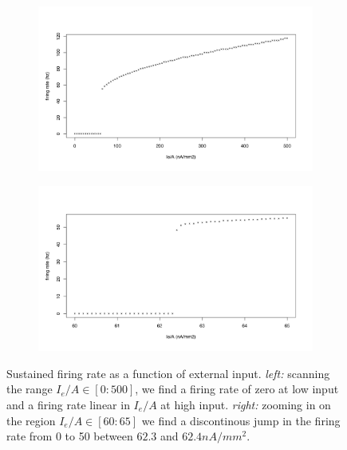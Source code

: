 \documentclass{article}
\begin{document}
\begin{figure}[h]
\begin{subfigure}[t]{0.48\linewidth}
	\centering
	\includegraphics[width = 1.0\linewidth, trim={20 30 40 70}, clip=true]{firing_rates.png}
	\label{fig:bigrates}	
\end{subfigure}
\hspace{0.02\linewidth}
\begin{subfigure}[t]{0.48\linewidth}
	\centering
	\includegraphics[width = 1.0\linewidth, trim={20 30 40 70}, clip=true]{firing_rates_finegrained.png}
	\label{fig:smallrates}	
\end{subfigure}
\label{fig:rates}
\caption{Sustained firing rate as a function of external input. \textit{left:} scanning the range $I_e/A \in [0:500]$, we find a firing rate of zero at low input and a firing rate linear in $I_e/A$ at high input. \textit{right:} zooming in on the region $I_e/A \in [60:65]$ we find a discontinous jump in the firing rate from 0 to 50 between $62.3$ and $62.4 nA/mm^2$. }
\end{figure}
\end{document}
